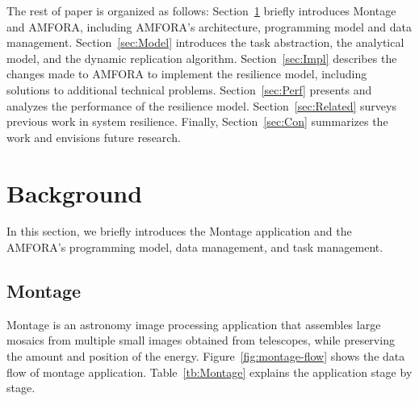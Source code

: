 \documentclass{sig-alternate}
\begin{document}
The rest of paper is organized as follows:
Section~\ref{sec:background} briefly introduces Montage and AMFORA, including AMFORA's architecture, programming model and data management.
Section~\ref{sec:Model} introduces the task abstraction, the analytical model, and the dynamic replication algorithm. 
Section~\ref{sec:Impl} describes the changes made to AMFORA 
to implement the resilience model, including solutions to additional technical problems. 
Section~\ref{sec:Perf} presents and analyzes the performance of the resilience model.  
Section~\ref{sec:Related} surveys previous work in system resilience.
Finally, Section~\ref{sec:Con} summarizes the work and envisions future research.

\section{Background}
\label{sec:background}
In this section, we briefly introduces the Montage application and the AMFORA's programming model, data management, and task management.

\subsection{Montage}
Montage is an astronomy image processing application that assembles large mosaics from multiple small images obtained from telescopes, while preserving the amount and position of the energy. 
Figure~\ref{fig:montage-flow} shows the data flow of montage application.
Table~\ref{tb:Montage} explains the application stage by stage.
\end{document}
